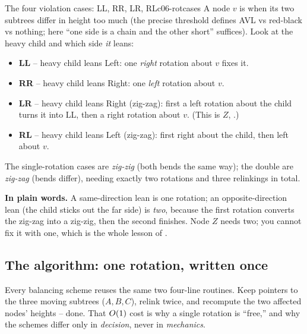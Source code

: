 \begin{definition}{The four violation cases: LL, RR, LR, RL}{c06-rotcases}
A node $v$ is  when its two subtrees differ in height too much (the precise threshold
defines AVL vs red-black vs nothing; here ``one side is a chain and the other short'' suffices). Look
at the heavy child and which side \emph{it} leans:
\begin{itemize}[nosep]
  \item \textbf{LL} -- heavy child leans Left: one \emph{right} rotation about $v$ fixes it.
  \item \textbf{RR} -- heavy child leans Right: one \emph{left} rotation about $v$.
  \item \textbf{LR} -- heavy child leans Right (zig-zag): first a left rotation about the child turns
        it into LL, then a right rotation about $v$. (This is $Z$, .)
  \item \textbf{RL} -- heavy child leans Left (zig-zag): first right about the child, then left about $v$.
\end{itemize}
The single-rotation cases are \emph{zig-zig} (both bends the same way); the double are \emph{zig-zag}
(bends differ), needing exactly two rotations and three relinkings in total.
\end{definition}

\noindent\textbf{In plain words.} A same-direction lean is one rotation; an opposite-direction lean
(the child sticks out the far side) is \emph{two}, because the first rotation converts the zig-zag
into a zig-zig, then the second finishes. Node $Z$ needs two; you cannot fix it with one, which is
the whole lesson of .

\subsection{The algorithm: one rotation, written once}

Every balancing scheme reuses the same two four-line routines. Keep pointers to the three moving
subtrees ($A,B,C$), relink twice, and recompute the two affected nodes' heights -- done. That
$O(1)$ cost is why a single rotation is ``free,'' and why the schemes differ only in
\emph{decision}, never in \emph{mechanics}.

